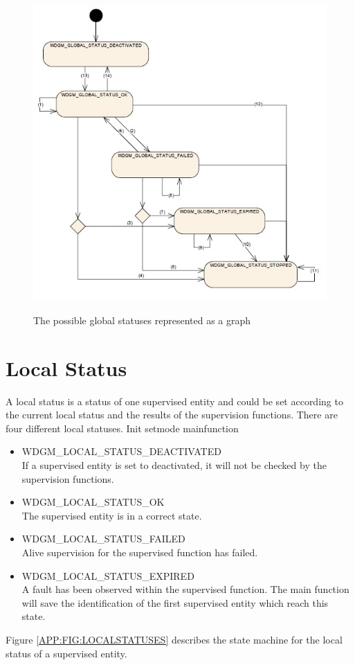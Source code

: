 \begin{figure}[!ht]
  \includegraphics{pictures/globalstatuses}
  \label{APP:FIG:GLOBALSTATUS}
  \caption{The possible global statuses represented as a graph}
\end{figure}

\section{Local Status}
A local status is a status of one supervised entity and could be set according
to the current local status and the results of the supervision functions. There
are four different local statuses. Init setmode mainfunction

\begin{itemize}
  \item WDGM\_LOCAL\_STATUS\_DEACTIVATED\\
    If a supervised entity is set to deactivated, it will not be checked by the
    supervision functions.
  \item WDGM\_LOCAL\_STATUS\_OK\\
    The supervised entity is in a correct state.
  \item WDGM\_LOCAL\_STATUS\_FAILED\\
    Alive supervision for the supervised function has failed.
  \item WDGM\_LOCAL\_STATUS\_EXPIRED\\
    A fault has been observed within the supervised function. The main function
    will save the identification of the first supervised entity which reach this
    state.
\end{itemize}
Figure \ref{APP:FIG:LOCALSTATUSES} describes the state machine for the local
status of a supervised entity.

